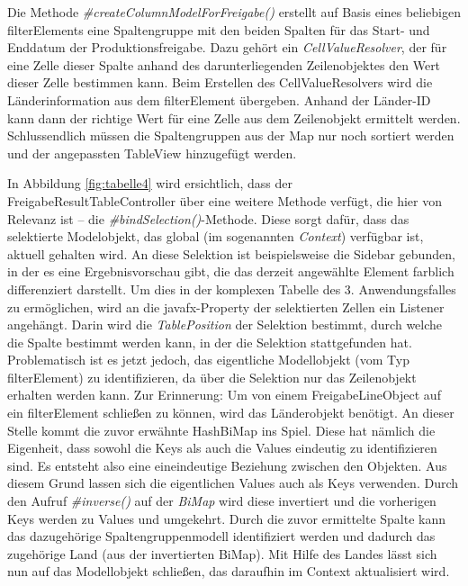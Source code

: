 Die Methode \textit{\#createColumnModelForFreigabe() }erstellt auf Basis eines beliebigen \gls{filterElement}s eine Spaltengruppe mit den beiden Spalten für das Start- und Enddatum der Produktionsfreigabe. Dazu gehört ein \textit{CellValueResolver}, der für eine Zelle dieser Spalte anhand des darunterliegenden Zeilenobjektes den Wert dieser Zelle bestimmen kann. Beim Erstellen des CellValueResolvers wird die Länderinformation aus dem \gls{filterElement} übergeben. Anhand der Länder-ID kann dann der richtige Wert für eine Zelle aus dem Zeilenobjekt ermittelt werden. Schlussendlich müssen die Spaltengruppen aus der Map nur noch sortiert werden und der angepassten TableView hinzugefügt werden.

In Abbildung \ref{fig:tabelle4} wird ersichtlich, dass der FreigabeResultTableController über eine weitere Methode verfügt, die hier von Relevanz ist – die \textit{\#bindSelection()}-Methode. Diese sorgt dafür, dass das selektierte Modelobjekt, das global (im sogenannten \textit{Context}) verfügbar ist, aktuell gehalten wird. An diese Selektion ist beispielsweise die Sidebar gebunden, in der es eine Ergebnisvorschau gibt, die das derzeit angewählte Element farblich differenziert darstellt. Um dies in der komplexen Tabelle des 3. Anwendungsfalles zu ermöglichen, wird an die \gls{javafx}-Property der selektierten Zellen ein Listener angehängt. Darin wird die \textit{TablePosition} der Selektion bestimmt, durch welche die Spalte bestimmt werden kann, in der die Selektion stattgefunden hat. Problematisch ist es jetzt jedoch, das eigentliche Modellobjekt (vom Typ \gls{filterElement}) zu identifizieren, da über die Selektion nur das Zeilenobjekt erhalten werden kann. Zur Erinnerung: Um von einem FreigabeLineObject auf ein \gls{filterElement} schließen zu können, wird das Länderobjekt benötigt. An dieser Stelle kommt die zuvor erwähnte HashBiMap ins Spiel. Diese hat nämlich die Eigenheit, dass sowohl die Keys als auch die Values eindeutig zu identifizieren sind. Es entsteht also eine eineindeutige Beziehung zwischen den Objekten. Aus diesem Grund lassen sich die eigentlichen Values auch als Keys verwenden. Durch den Aufruf \textit{\#inverse()} auf der \textit{BiMap} wird diese invertiert und die vorherigen Keys werden zu Values und umgekehrt. Durch die zuvor ermittelte Spalte kann das dazugehörige Spaltengruppenmodell identifiziert werden und dadurch das zugehörige Land (aus der invertierten BiMap). Mit Hilfe des Landes lässt sich nun auf das Modellobjekt schließen, das daraufhin im Context aktualisiert wird.

